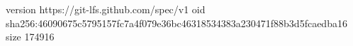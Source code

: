 version https://git-lfs.github.com/spec/v1
oid sha256:46090675c5795157fc7a4f079e36bc46318534383a230471f88b3d5fcaedba16
size 174916
